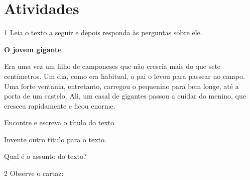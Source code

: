 \section*{Atividades}

\num{1} Leia o texto a seguir e depois responda às perguntas sobre ele. 

\begin{myquote}
\begin{center}
\textbf{O jovem gigante}
\end{center}

Era uma vez um filho de camponeses que não crescia mais do que sete
centímetros. Um dia, como era habitual, o pai o levou para passear no
campo. Uma forte ventania, entretanto, carregou o pequenino para bem
longe, até a porta de um castelo. Ali, um casal de gigantes passou a
cuidar do menino, que cresceu rapidamente e ficou enorme.

\end{myquote}

\begin{escolha}
\item Encontre e escreva o título do texto.\\

\item Invente outro título para o texto.\\

\item Qual é o assunto do texto?\\
\end{escolha}

\pagebreak
\num{2} Observe o cartaz:


